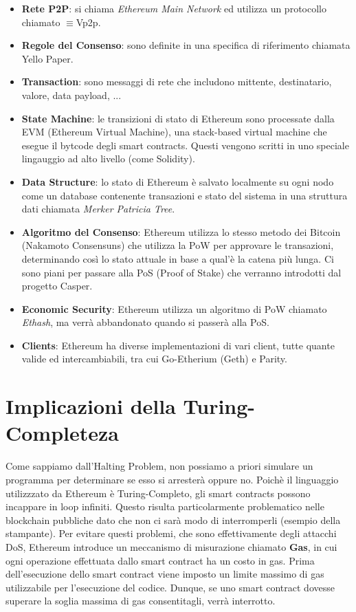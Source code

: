 \begin{itemize}
      \item \textbf{Rete P2P}: si chiama \textit{Ethereum Main Network} ed
            utilizza un protocollo chiamato \DH$\equiv$Vp2p.
      \item \textbf{Regole del Consenso}: sono definite in una specifica di riferimento chiamata
            Yello Paper.
      \item \textbf{Transaction}: sono messaggi di rete che includono mittente, destinatario,
            valore, data payload, ...
      \item \textbf{State Machine}: le transizioni di stato di Ethereum sono processate dalla
            EVM (Ethereum Virtual Machine), una stack-based virtual machine che esegue il bytcode
            degli smart contracts. Questi vengono scritti in uno speciale lingauggio ad alto livello
            (come Solidity).
      \item \textbf{Data Structure}: lo stato di Ethereum è salvato localmente su ogni nodo come
            un database contenente transazioni e stato del sistema in una struttura dati chiamata
            \textit{Merker Patricia Tree}.
      \item \textbf{Algoritmo del Consenso}: Ethereum utilizza lo stesso metodo dei Bitcoin
            (Nakamoto Consensuns) che utilizza la PoW per approvare le transazioni,
            determinando così lo stato attuale in base a qual'è la catena più lunga.
            Ci sono piani per passare alla PoS (Proof of Stake) che verranno introdotti dal
            progetto Casper.
      \item \textbf{Economic Security}: Ethereum utilizza un algoritmo di PoW chiamato \textit{Ethash},
            ma verrà abbandonato quando si passerà alla PoS.
      \item \textbf{Clients}: Ethereum ha diverse implementazioni di vari client,
            tutte quante valide ed intercambiabili, tra cui Go-Etherium (Geth) e Parity.
\end{itemize}

\section{Implicazioni della Turing-Completeza}
Come sappiamo dall'Halting Problem, non possiamo a priori simulare un programma per
determinare se esso si arresterà oppure no. Poichè il linguaggio utilizzzato da Ethereum è
Turing-Completo, gli smart contracts possono incappare in loop infiniti. Questo risulta
particolarmente problematico nelle blockchain pubbliche dato che non ci sarà modo di interromperli
(esempio della stampante). Per evitare questi problemi, che sono effettivamente degli attacchi DoS,
Ethereum introduce un meccanismo di misurazione chiamato \textbf{Gas}, in cui ogni operazione
effettuata dallo smart contract ha un costo in gas. Prima dell'esecuzione dello smart contract
viene imposto un limite massimo di gas utilizzabile per l'esecuzione del codice.
Dunque, se uno smart contract dovesse superare la soglia massima di gas consentitagli,
verrà interrotto.\\

